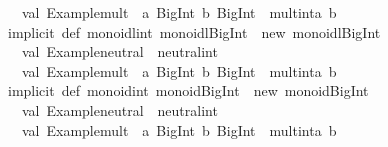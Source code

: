 \begin{isabellebody}
\begin{isamarkuptext}
\ \ val\ {}Example{}mult{}\ {}\ {}a{}\ BigInt{}\ b{}\ BigInt{}\ {}{}\ mult{}int{}a{}\ b{}\isanewline
{}\isanewline
\isanewline
implicit\ def\ monoidl{}int{}\ monoidl{}BigInt{}\ {}\ new\ monoidl{}BigInt{}\ {}\isanewline
\ \ val\ {}Example{}neutral{}\ {}\ neutral{}int\isanewline
\ \ val\ {}Example{}mult{}\ {}\ {}a{}\ BigInt{}\ b{}\ BigInt{}\ {}{}\ mult{}int{}a{}\ b{}\isanewline
{}\isanewline
\isanewline
implicit\ def\ monoid{}int{}\ monoid{}BigInt{}\ {}\ new\ monoid{}BigInt{}\ {}\isanewline
\ \ val\ {}Example{}neutral{}\ {}\ neutral{}int\isanewline
\ \ val\ {}Example{}mult{}\ {}\ {}a{}\ BigInt{}\ b{}\ BigInt{}\ {}{}\ mult{}int{}a{}\ b{}\isanewline

\end{isamarkuptext}
\end{isabellebody}
